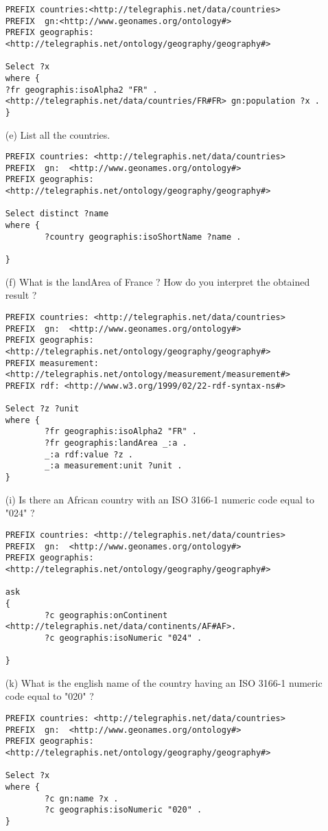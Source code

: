 \documentclass[a4paper, 12pt]{report}
\begin{document}
\begin{enumerate}
\begin{lstlisting}[frame=single]
PREFIX countries:<http://telegraphis.net/data/countries>
PREFIX  gn:<http://www.geonames.org/ontology#>
PREFIX geographis:<http://telegraphis.net/ontology/geography/geography#>

Select ?x
where {
?fr geographis:isoAlpha2 "FR" .
<http://telegraphis.net/data/countries/FR#FR> gn:population ?x .
}
\end{lstlisting}
\item[(e)] List all the countries. 
\begin{lstlisting}[frame=single]
PREFIX countries: <http://telegraphis.net/data/countries>
PREFIX  gn:  <http://www.geonames.org/ontology#>
PREFIX geographis:  <http://telegraphis.net/ontology/geography/geography#>

Select distinct ?name
where {
        ?country geographis:isoShortName ?name .

}
\end{lstlisting}

\item[(f)] What is the landArea of France ? How do you interpret the obtained result ? 
\begin{lstlisting}[frame=single]
PREFIX countries: <http://telegraphis.net/data/countries>
PREFIX  gn:  <http://www.geonames.org/ontology#>
PREFIX geographis:  <http://telegraphis.net/ontology/geography/geography#>
PREFIX measurement: <http://telegraphis.net/ontology/measurement/measurement#>
PREFIX rdf: <http://www.w3.org/1999/02/22-rdf-syntax-ns#>

Select ?z ?unit
where {
        ?fr geographis:isoAlpha2 "FR" .
        ?fr geographis:landArea _:a .
        _:a rdf:value ?z .
        _:a measurement:unit ?unit .
}

\end{lstlisting}

\item[(i)] Is there an African country with an ISO 3166-1 numeric code equal to "024" ?
\begin{lstlisting}[frame=single]
PREFIX countries: <http://telegraphis.net/data/countries>
PREFIX  gn:  <http://www.geonames.org/ontology#>
PREFIX geographis:  <http://telegraphis.net/ontology/geography/geography#>

ask
{
        ?c geographis:onContinent <http://telegraphis.net/data/continents/AF#AF>.
        ?c geographis:isoNumeric "024" .

}

\end{lstlisting}

\item[(k)] What is the english name of the country having an ISO 3166-1 numeric code equal to "020" ?
\begin{lstlisting}[frame=single]
PREFIX countries: <http://telegraphis.net/data/countries>
PREFIX  gn:  <http://www.geonames.org/ontology#>
PREFIX geographis:  <http://telegraphis.net/ontology/geography/geography#>

Select ?x
where {
        ?c gn:name ?x .
        ?c geographis:isoNumeric "020" .
}
\end{lstlisting}
\end{enumerate}
\end{document}
